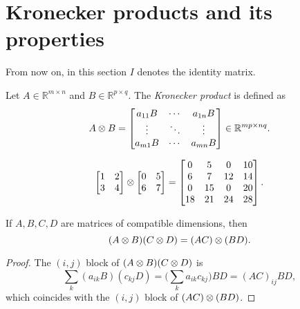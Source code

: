 \chapter{Kronecker products and its properties}

From now on, in this section $I$ denotes the identity matrix.

\begin{definition}
    Let $A \in \mathbb{R}^{m \times n}$ and $B \in \mathbb{R}^{p \times q}$. 
    The \emph{Kronecker product} is defined as
    \[
        A \otimes B = 
        \begin{bmatrix}
            a_{11}B & \cdots & a_{1n}B \\
            \vdots & \ddots & \vdots \\
            a_{m1}B & \cdots & a_{mn}B
        \end{bmatrix} \in \mathbb{R}^{mp \times nq}.
    \]
    \label{ch:krondef}
\end{definition}

\begin{example}
\[
    \begin{bmatrix}
        1 & 2 \\
        3 & 4
    \end{bmatrix}
    \otimes
    \begin{bmatrix}
        0 & 5 \\
        6 & 7
    \end{bmatrix} 
    =
    \begin{bmatrix}
        0 & 5 & 0 & 10 \\
        6 & 7 & 12 & 14 \\
        0 & 15 & 0 & 20 \\
        18 & 21 & 24 & 28
    \end{bmatrix}.
\]
\end{example}

\begin{proposition}
    If $A,B,C,D$ are matrices of compatible dimensions, then
    \[
        (A \otimes B)(C \otimes D) = (AC) \otimes (BD).
    \]
    \label{prop:prod}
\end{proposition}

\begin{proof}
    The $(i,j)$ block of $(A \otimes B)(C \otimes D)$ is
    \[
        \sum_k (a_{ik}B)(c_{kj}D) = \Big(\sum_k a_{ik}c_{kj}\Big) BD = (AC)_{ij}BD,
    \]
    which coincides with the $(i,j)$ block of $(AC) \otimes (BD)$.
\end{proof}

